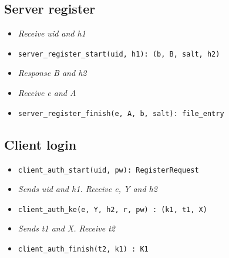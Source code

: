 \documentclass[../report.tex]{subfiles}
\begin{document}
\subsection{Server register}
\begin{itemize}
 \item \emph{Receive uid and h1}
 \item \verb|server_register_start(uid, h1): (b, B, salt, h2)|
 \item \emph{Response B and h2}
 \item \emph{Receive e and A}
 \item \verb|server_register_finish(e, A, b, salt): file_entry|
\end{itemize}



\subsection{Client login}
\begin{itemize}
 \item \verb|client_auth_start(uid, pw): RegisterRequest| %
 \item \emph{Sends uid and h1. Receive e, Y and h2}
 \item \verb|client_auth_ke(e, Y, h2, r, pw) : (k1, t1, X)|
 \item \emph{Sends t1 and X. Receive t2}
 \item \verb|client_auth_finish(t2, k1) : K1|

\end{itemize}
\end{document}
